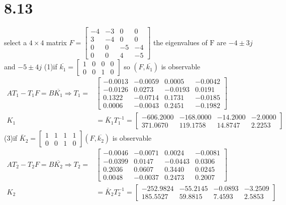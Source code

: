 \documentclass{article}
\begin{document}
\section*{8.13}
select a  $4 \times 4$  matrix $F=\left[\begin{array}{cccc}-4 & -3 & 0 & 0 \\ 3 & -4 & 0 & 0 \\ 0 & 0 & -5 & -4 \\ 0 & 0 & 4 & -5\end{array}\right]$
the eigenvalues of $\mathrm{F}$ are $-4 \pm 3 j$ and $-5 \pm 4 j$
(1)if $\overline{k_{1}}=\left[\begin{array}{llll}1 & 0 & 0 & 0 \\ 0 & 0 & 1 & 0\end{array}\right]$ so $(F, \overline{k_{1}})$ is observable
$$
\begin{aligned}
A T_{1}-T_{1} F=B \overline{K_{1}} \Rightarrow T_{1}=&\left[\begin{array}{cccc}
-0.0013 & -0.0059 & 0.0005 & -0.0042 \\
-0.0126 & 0.0273 & -0.0193 & 0.0191 \\
0.1322 & -0.0714 & 0.1731 & -0.0185 \\
0.0006 & -0.0043 & 0.2451 & -0.1982
\end{array}\right] \\
K_{1} &=\bar{K}_{1} T_{1}^{-1}=\left[\begin{array}{cccc}
-606.2000 & -168.0000 & -14.2000 & -2.0000 \\
371.0670 & 119.1758 & 14.8747 & 2.2253
\end{array}\right]
\end{aligned}
$$
(3)if $\bar{K}_{2}=\left[\begin{array}{llll}1 & 1 & 1 & 1 \\ 0 & 0 & 1 & 0\end{array}\right]\left(F, \overline{k_{2}}\right)$ is observable
$$
\begin{aligned}
A T_{2}-T_{2} F=B \overline{K_{2}} \Rightarrow T_{2}=&\left[\begin{array}{cccc}
-0.0046 & -0.0071 & 0.0024 & -0.0081 \\
-0.0399 & 0.0147 & -0.0443 & 0.0306 \\
0.2036 & 0.0607 & 0.3440 & 0.0245 \\
0.0048 & -0.0037 & 0.2473 & 0.2007
\end{array}\right] \\
K_{2} &=\bar{K}_{2} T_{2}^{-1}=\left[\begin{array}{cccc}
-252.9824 & -55.2145 & -0.0893 & -3.2509 \\
185.5527 & 59.8815 & 7.4593 & 2.5853
\end{array}\right]
\end{aligned}
$$
\end{document}
